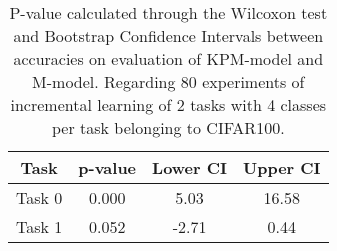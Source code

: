 \begin{table}[H]
\centering
\begin{tabular}{cccc}
\toprule
Task & p-value & Lower CI & Upper CI \\
\midrule
Task 0 & 0.000 &5.03 & 16.58 \\
Task 1 & 0.052 &-2.71 & 0.44 \\
\bottomrule
\end{tabular}
\caption{P-value calculated through the Wilcoxon test and Bootstrap Confidence Intervals between accuracies on evaluation of KPM-model and M-model. Regarding 80 experiments of incremental learning of 2 tasks with 4 classes per task belonging to CIFAR100.}
\end{table}
